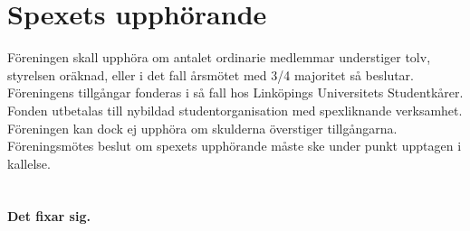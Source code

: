 \documentclass[a4paper]{article}
\begin{document}
\section{Spexets upphörande}
Föreningen skall upphöra om antalet ordinarie medlemmar understiger tolv, styrelsen oräknad, eller i det fall årsmötet med 3/4 majoritet så beslutar. Föreningens tillgångar fonderas i så fall hos Linköpings Universitets Studentkårer. Fonden utbetalas till nybildad studentorganisation med spexliknande verksamhet. Föreningen kan dock ej upphöra om skulderna överstiger tillgångarna. Föreningsmötes beslut om spexets upphörande måste ske under punkt upptagen i kallelse.

\setcounter{section}{16}
\section{ }
\textbf{Det fixar sig.}
\end{document}
